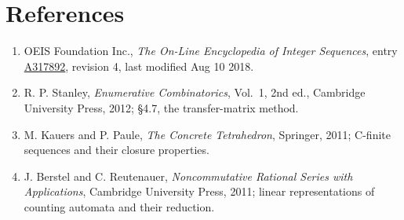 \documentclass[11pt]{article}
\theoremstyle{definition}
\begin{document}
\section{References}

\begin{enumerate}

\item OEIS Foundation Inc., \emph{The On-Line Encyclopedia of Integer Sequences}, entry \href{https://oeis.org/A317892}{A317892}, revision 4, last modified Aug 10 2018.

\item R. P. Stanley, \emph{Enumerative Combinatorics}, Vol.~1, 2nd ed., Cambridge University Press, 2012; \S4.7, the transfer-matrix method.

\item M. Kauers and P. Paule, \emph{The Concrete Tetrahedron}, Springer, 2011; C-finite sequences and their closure properties.

\item J. Berstel and C. Reutenauer, \emph{Noncommutative Rational Series with Applications}, Cambridge University Press, 2011; linear representations of counting automata and their reduction.

\end{enumerate}
\end{document}
